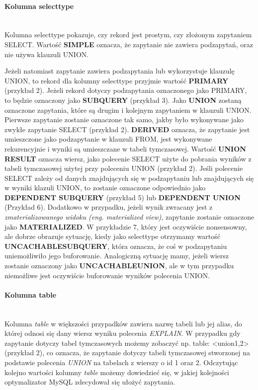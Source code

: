 \paragraph{Kolumna select\textunderscore type}\leavevmode\\
Kolumna select\textunderscore type pokazuje, czy rekord jest prostym, czy złożonym zapytaniem SELECT. 
Wartość \textbf{SIMPLE} oznacza, że zapytanie nie zawiera podzapytań, oraz nie używa klauzuli UNION.

Jeżeli natomiast zapytanie zawiera podzapytania lub wykorzystuje klauzulę UNION, to rekord dla kolumny select\textunderscore type przyjmie wartość \textbf{PRIMARY} (przykład 2). Jeżeli rekord dotyczy podzapytania oznaczonego jako PRIMARY, to będzie oznaczony jako \textbf{SUBQUERY} (przykład 3). Jako \textbf{UNION} zostaną oznaczone zapytania, które są drugim i kolejnym zapytaniem w klauzuli UNION. Pierwsze zapytanie zostanie oznaczone tak samo, jakby było wykonywane jako zwykłe zapytanie SELECT (przykład 2). \textbf{DERIVED} oznacza, że zapytanie jest umieszczone jako podzapytanie w klauzuli FROM, jest wykonywane rekurencyjnie i wyniki są umieszczane w tabeli tymczasowej. Wartość \textbf{UNION RESULT} oznacza wiersz, jako polecenie SELECT użyte do pobrania wyników z tabeli tymczasowej użytej przy poleceniu UNION (przykład 2). Jeśli polecenie SELECT zależy od danych znajdujących się w podzapytaniu lub znajdujących się w wyniki klazuli UNION, to zostanie oznaczone odpowiednio jako \textbf{DEPENDENT SUBQUERY} (przykład 5) lub \textbf{DEPENDENT UNION} (Przykład 6). Dodatkowo w przypadku, jeżeli wynik zwracany jest z \textit{zmaterializowanego widoku (eng. materialized view)}, zapytanie zostanie oznaczone jako \textbf{MATERIALIZED}. W przykładzie 7, który jest oczywiście nonsensowny, ale dobrze obrazuje sytuację, kiedy jako select\textunderscore type otrzymamy wartość \textbf{UNCACHABLE\textunderscore SUBQUERY}, która oznacza, że coś w podzapytaniu uniemożliwiło jego buforowanie. Analogiczną sytuację mamy, jeżeli wiersz zostanie oznaczony jako \textbf{UNCACHABLE\textunderscore UNION}, ale w tym przypadku niemożliwe jest oczywiście buforowanie wyników polecenia UNION.

\paragraph{Kolumna table}\leavevmode\\
Kolumna \textit{table} w większości przypadków zawiera nazwę tabeli lub jej alias, do której odnosi się dany wiersz wyniku polecenia \textit{EXPLAIN}. W przypadku gdy zapytanie dotyczy tabel tymczasowych możemy zobaczyć np. table: <union1,2> (przykład 2), co oznacza, że zapytanie dotyczy tabeli tymczasowej stworzonej na podstawie polecenia \textit{UNION} na tabelach z wierszy o id 1 oraz 2.
Odczytując kolejno wartości kolumny \textit{table} możemy dowiedzieć się, w jakiej kolejności optymalizator MySQL zdecydował się ułożyć zapytania. 

